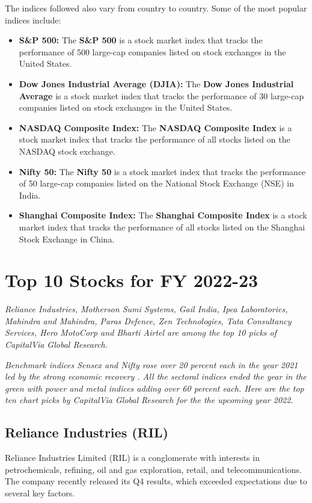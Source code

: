 The indices followed also vary from country to country. Some of the most popular indices include:

\begin{itemize}
\item \textbf{S\&P 500:} The \textbf{S\&P 500} is a stock market index that tracks the performance of 500 large-cap companies listed on stock exchanges in the United States.
\item \textbf{Dow Jones Industrial Average (DJIA):} The \textbf{Dow Jones Industrial Average} is a stock market index that tracks the performance of 30 large-cap companies listed on stock exchanges in the United States.
\item \textbf{NASDAQ Composite Index:} The \textbf{NASDAQ Composite Index} is a stock market index that tracks the performance of all stocks listed on the NASDAQ stock exchange.
\item \textbf{Nifty 50:} The \textbf{Nifty 50} is a stock market index that tracks the performance of 50 large-cap companies listed on the National Stock Exchange (NSE) in India.
\item \textbf{Shanghai Composite Index:} The \textbf{Shanghai Composite Index} is a stock market index that tracks the performance of all stocks listed on the Shanghai Stock Exchange in China.
\end{itemize}

\section{Top 10 Stocks for FY 2022-23}

\textit{Reliance Industries, Motherson Sumi Systems, Gail India, Ipca Laboratories, Mahindra and Mahindra, Paras Defence, Zen Technologies, Tata Consultancy Services, Hero MotoCorp and Bharti Airtel are among the top 10 picks of CapitalVia Global Research.}

\textit{Benchmark indices Sensex and Nifty rose over 20 percent each in the year 2021 led by the strong economic recovery . All the sectoral indices ended the year in the green with power and metal indices adding over 60 percent each. Here are the top ten chart picks by CapitalVia Global Research for the the upcoming year 2022.
}
\subsection{Reliance Industries (RIL)} Reliance Industries Limited (RIL) is a conglomerate with interests in petrochemicals, refining, oil and gas exploration, retail, and telecommunications. The company recently released its Q4 results, which exceeded expectations due to several key factors.

